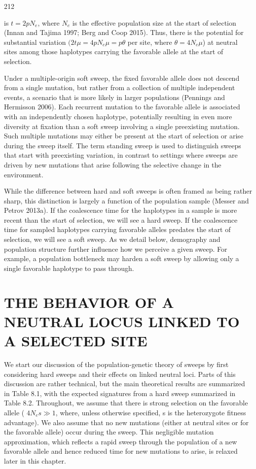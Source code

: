 \documentclass{article}
\begin{document}
212

is $t = 2pN_e$, where $N_e$ is the effective population size at the start of selection (Innan and Tajima 1997; Berg and Coop 2015). Thus, there is the potential for substantial variation $(2t\mu = 4pN_e\mu = p\theta$ per site, where $\theta = 4N_e\mu$) at neutral sites among those haplotypes carrying the favorable allele at the start of selection.

Under a multiple-origin soft sweep, the fixed favorable allele does not descend from a single mutation, but rather from a collection of multiple independent events, a scenario that is more likely in larger populations (Pennings and Hermisson 2006). Each recurrent mutation to the favorable allele is associated with an independently chosen haplotype, potentially resulting in even more diversity at fixation than a soft sweep involving a single preexisting mutation. Such multiple mutations may either be present at the start of selection or arise during the sweep itself. The term standing sweep is used to distinguish sweeps that start with preexisting variation, in contrast to settings where sweeps are driven by new mutations that arise following the selective change in the environment.

While the difference between hard and soft sweeps is often framed as being rather sharp, this distinction is largely a function of the population sample (Messer and Petrov 2013a). If the coalescence time for the haplotypes in a sample is more recent than the start of selection, we will see a hard sweep. If the coalescence time for sampled haplotypes carrying favorable alleles predates the start of selection, we will see a soft sweep. As we detail below, demography and population structure further influence how we perceive a given sweep. For example, a population bottleneck may harden a soft sweep by allowing only a single favorable haplotype to pass through.

\section{THE BEHAVIOR OF A NEUTRAL LOCUS LINKED TO A SELECTED SITE}
We start our discussion of the population-genetic theory of sweeps by first considering hard sweeps and their effects on linked neutral loci. Parts of this discussion are rather technical, but the main theoretical results are summarized in Table 8.1, with the expected signatures from a hard sweep summarized in Table 8.2. Throughout, we assume that there is strong selection on the favorable allele ( $ 4N_{e}s \gg 1 $, where, unless otherwise specified, s is the heterozygote fitness advantage). We also assume that no new mutations (either at neutral sites or for the favorable allele) occur during the sweep. This negligible mutation approximation, which reflects a rapid sweep through the population of a new favorable allele and hence reduced time for new mutations to arise, is relaxed later in this chapter.
\end{document}
